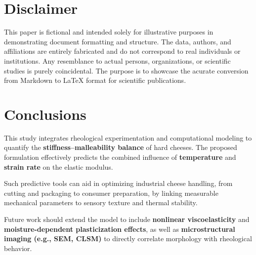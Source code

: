 \documentclass[a4paper,twoside]{article}
\begin{document}
\section{Disclaimer}
This paper is fictional and intended solely for illustrative purposes in demonstrating
document formatting and structure. The data, authors, and affiliations are entirely
fabricated and do not correspond to real individuals or institutions. Any resemblance
to actual persons, organizations, or scientific studies is purely coincidental.
The purpose is to showcase the acurate conversion from Markdown to \LaTeX{} format
for scientific publications.
\section{Conclusions}
This study integrates rheological experimentation and computational modeling to
quantify the \textbf{stiffness--malleability balance} of hard cheeses. The proposed
formulation effectively predicts the combined influence of \textbf{temperature} and
\textbf{strain rate} on the elastic modulus.

Such predictive tools can aid in optimizing industrial cheese handling, from cutting
and packaging to consumer preparation, by linking measurable mechanical parameters to
sensory texture and thermal stability.

Future work should extend the model to include \textbf{nonlinear viscoelasticity} and
\textbf{moisture-dependent plasticization effects}, as well as \textbf{microstructural imaging
(e.g., SEM, CLSM)} to directly correlate morphology with rheological behavior.

\printbibliography
\end{document}
